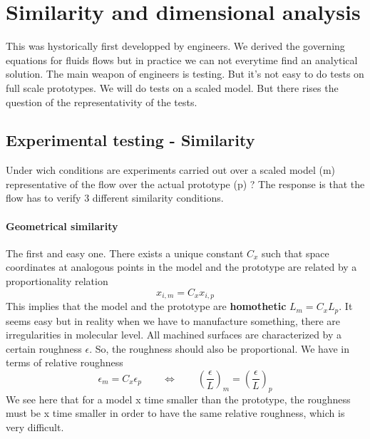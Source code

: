 
\chapter{Similarity and dimensional analysis}

This was hystorically first developped by engineers. We derived the governing equations for fluids flows but in practice we can not everytime find an analytical solution. The main weapon of engineers is testing. But it's not easy to do tests on full scale prototypes. We will do tests on a scaled model. But there rises the question of the representativity of the tests. 

\section{Experimental testing - Similarity}
	Under wich conditions are experiments carried out over a scaled model (m) representative of the flow over the actual prototype (p) ? The response is that the flow has to verify 3 different similarity conditions. 
	
			\subsubsection{Geometrical similarity} 
				The first and easy one. There exists a unique constant $C_x$ such that space coordinates at analogous points in the model and the prototype are related by a proportionality relation 
				\begin{equation}
					x_{i,m} = C_x x_{i,p}
					\label{eq:2.1}
				\end{equation}
				This implies that the model and the prototype are \textbf{homothetic} $L_m = C_x L_p$. It seems easy but in reality when we have to manufacture something, there are irregularities in molecular level. All machined surfaces are characterized by a certain roughness $\epsilon$. So, the roughness should also be proportional. We have in terms of relative roughness 
				\begin{equation}
					\epsilon _m = C_x \epsilon _p \qquad \Leftrightarrow \qquad \left( \frac{\epsilon}{L}\right) _m = \left( \frac{\epsilon}{L}\right) _p
				\end{equation}
				We see here that for a model x time smaller than the prototype, the roughness must be x time smaller in order to have the same relative roughness, which is very difficult. 
				

